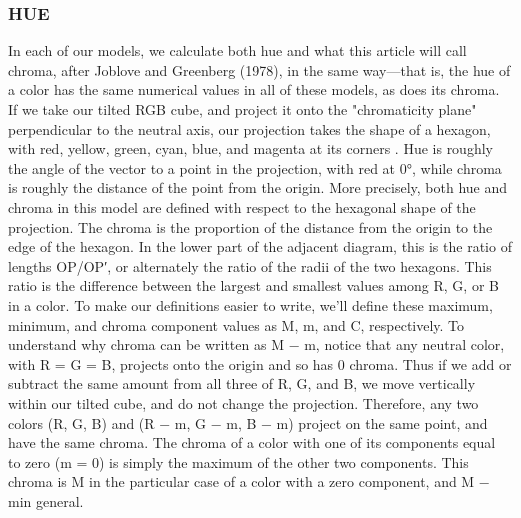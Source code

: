 \subsubsection{HUE}
In each of our models, we calculate both hue and what this article will call chroma, after Joblove and Greenberg (1978), in the same way—that is, the hue of a color has the same numerical values in all of these models, as does its chroma. If we take our tilted RGB cube, and project it onto the "chromaticity plane" perpendicular to the neutral axis, our projection takes the shape of a hexagon, with red, yellow, green, cyan, blue, and magenta at its corners . Hue is roughly the angle of the vector to a point in the projection, with red at 0°, while chroma is roughly the distance of the point from the origin.
More precisely, both hue and chroma in this model are defined with respect to the hexagonal shape of the projection. The chroma is the proportion of the distance from the origin to the edge of the hexagon. In the lower part of the adjacent diagram, this is the ratio of lengths OP/OP′, or alternately the ratio of the radii of the two hexagons. This ratio is the difference between the largest and smallest values among R, G, or B in a color. To make our definitions easier to write, we’ll define these maximum, minimum, and chroma component values as M, m, and C, respectively.
To understand why chroma can be written as M − m, notice that any neutral color, with R = G = B, projects onto the origin and so has 0 chroma. Thus if we add or subtract the same amount from all three of R, G, and B, we move vertically within our tilted cube, and do not change the projection. Therefore, any two colors (R, G, B) and (R − m, G − m, B − m) project on the same point, and have the same chroma. The chroma of a color with one of its components equal to zero (m = 0) is simply the maximum of the other two components. This chroma is M in the particular case of a color with a zero component, and M − min general.

